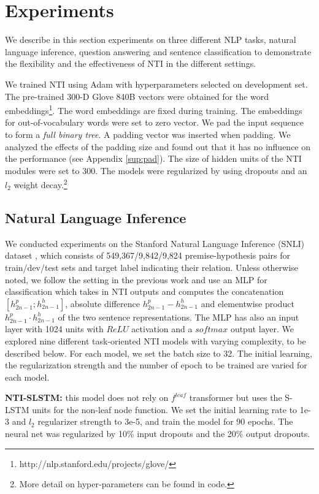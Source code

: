 \documentclass[11pt]{article}
\begin{document}
\section{Experiments}

We describe in this section experiments on three different NLP tasks, natural language inference, question answering and sentence classification to demonstrate the flexibility and the effectiveness of NTI in the different settings.

We trained NTI using Adam \cite{kingma:14} with hyperparameters selected on development set. The pre-trained 300-D Glove 840B vectors \cite{pennington:14} were obtained for the word embeddings\footnote{http://nlp.stanford.edu/projects/glove/}. The word embeddings are fixed during training. The embeddings for out-of-vocabulary words were set to zero vector. We pad the input sequence to form a \textit{full binary tree}. A padding vector was inserted when padding. We analyzed the effects of the padding size and found out that it has no influence on the performance (see Appendix \ref{sup:pad}). The size of hidden units of the NTI modules were set to 300. The models were regularized by using dropouts and an $l_2$ weight decay.\footnote{More detail on hyper-parameters can be found in code.}

\subsection{Natural Language Inference}

We conducted experiments on the Stanford Natural Language Inference (SNLI) dataset \cite{bowman:15}, which consists of 549,367/9,842/9,824 premise-hypothesis pairs for train/dev/test sets and target label indicating their relation. Unless otherwise noted, we follow the setting in the previous work \cite{Lili16,BowmanGRGMP16} and use an MLP 
for classification which takes in NTI outputs and computes the concatenation $[h^p_{2n-1};h^h_{2n-1}]$, absolute difference $h^p_{2n-1}-h^h_{2n-1}$ and elementwise product $h^p_{2n-1} \cdot h^h_{2n-1}$ of the two sentence representations. The MLP has also an input layer with 1024 units with $ReLU$ activation and a $softmax$ output layer. We explored nine different task-oriented NTI models with varying complexity, to be described below. For each model, we set the batch size to 32. The initial learning, the regularization strength and the number of epoch to be trained are varied for each model.

\textbf{NTI-SLSTM:} this model does not rely on $f^{leaf}$ transformer but uses the S-LSTM units for the non-leaf node function. We set the initial learning rate to 1e-3 and $l_2$ regularizer strength to 3e-5, and train the model for 90 epochs. The neural net was regularized by 10\% input dropouts and the 20\% output dropouts. 
\end{document}

